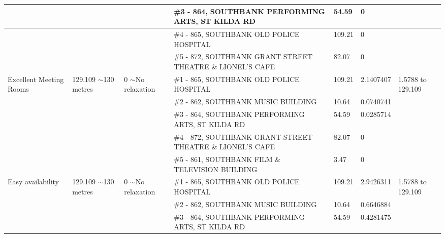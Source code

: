 \begin{table}[H]
{\begin{tabular}{|l|l|l|l|l|l|l|}
                        &                           &                          & \#3 - 864, SOUTHBANK PERFORMING ARTS, ST KILDA RD          & 54.59         & 0               &                           \\ \hline
                        &                           &                          & \#4 - 865, SOUTHBANK OLD POLICE HOSPITAL                   & 109.21        & 0               &                           \\ \hline
                        &                           &                          & \#5 - 872, SOUTHBANK GRANT STREET THEATRE \& LIONEL'S CAFE & 82.07         & 0               &                           \\ \hline
Excellent Meeting Rooms & 129.109 $\sim$130 metres  & 0 $\sim$No relaxation    & \#1 - 865, SOUTHBANK OLD POLICE HOSPITAL                   & 109.21        & 2.1407407       & 1.5788 to 129.109         \\ \hline
                        &                           &                          & \#2 - 862, SOUTHBANK MUSIC BUILDING                        & 10.64         & 0.0740741       &                           \\ \hline
                        &                           &                          & \#3 - 864, SOUTHBANK PERFORMING ARTS, ST KILDA RD          & 54.59         & 0.0285714       &                           \\ \hline
                        &                           &                          & \#4 - 872, SOUTHBANK GRANT STREET THEATRE \& LIONEL'S CAFE & 82.07         & 0               &                           \\ \hline
                        &                           &                          & \#5 - 861, SOUTHBANK FILM \& TELEVISION BUILDING           & 3.47          & 0               &                           \\ \hline
Easy availability       & 129.109 $\sim$130 metres  & 0 $\sim$No relaxation    & \#1 - 865, SOUTHBANK OLD POLICE HOSPITAL                   & 109.21        & 2.9426311       & 1.5788 to 129.109         \\ \hline
                        &                           &                          & \#2 - 862, SOUTHBANK MUSIC BUILDING                        & 10.64         & 0.6646884       &                           \\ \hline
                        &                           &                          & \#3 - 864, SOUTHBANK PERFORMING ARTS, ST KILDA RD          & 54.59         & 0.4281475       &                           \\ \hline

\end{tabular}}
\end{table}
